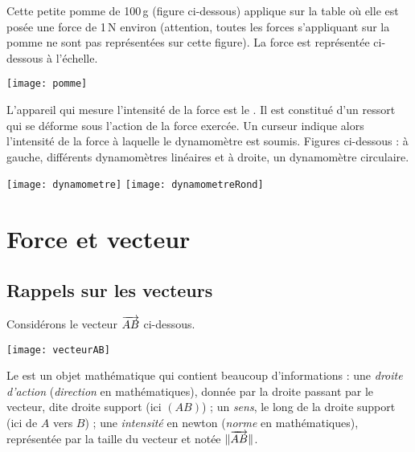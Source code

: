 \vspace{1em}


Cette petite pomme de 100\,g (figure ci-dessous) applique sur la table où elle est posée une force de 1\,N environ (attention, toutes les forces s'appliquant sur la pomme ne sont pas représentées sur cette figure). La force est représentée ci-dessous à l'échelle.

\begin{center}
    \texttt{[image: pomme]}
\end{center}

\vspace{1em}

L'appareil qui mesure l'intensité de la force est le \textbf{}. Il est constitué d'un ressort qui se déforme sous l'action de la force exercée. Un curseur indique alors l'intensité de la force à laquelle le dynamomètre est soumis. Figures ci-dessous : à gauche, différents dynamomètres linéaires et à droite, un dynamomètre circulaire.


\begin{center}
    \texttt{[image: dynamometre]}%
    \hfill%
    \texttt{[image: dynamometreRond]}
\end{center}



\section{Force et vecteur}\label{ForceVecteur}

\subsection{Rappels sur les vecteurs}

Considérons le vecteur $\overrightarrow{AB}$ ci-dessous.

\begin{center}
    \texttt{[image: vecteurAB]}
\end{center}

\vspace{1em}

Le  est un objet mathématique qui contient beaucoup d'informations : une \emph{droite d'action} (\emph{direction} en mathématiques), donnée par la droite passant par le vecteur, dite droite support (ici $(AB)$) ; un \emph{sens}, le long de la droite support (ici de $A$ vers $B$) ; une \emph{intensité} en newton (\emph{norme} en mathématiques), représentée par la taille du vecteur et notée $\lVert\overrightarrow{AB}\rVert$.

